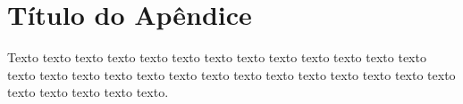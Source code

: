 \chapter{Título do Apêndice}
\label{cap:ape}

Texto texto texto texto texto texto texto texto texto texto texto texto texto
texto texto texto texto texto texto texto texto texto texto texto texto texto
texto texto texto texto texto texto.
